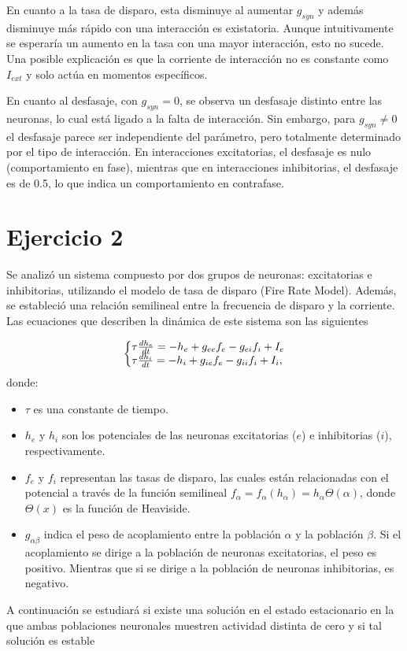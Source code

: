 \documentclass[aps,prb,twocolumn,superscriptaddress,floatfix,longbibliography]{revtex4-2}
\newcounter{para}
\begin{document}
En cuanto a la tasa de disparo, esta disminuye al aumentar \(g_{syn}\) y además disminuye más rápido con una interacción es existatoria. Aunque intuitivamente se esperaría un aumento en la tasa con una mayor interacción, esto no sucede. Una posible explicación es que la corriente de interacción no es constante como $I_{ext}$ y solo actúa en momentos específicos.

En cuanto al desfasaje, con $g_{syn} = 0$, se observa un desfasaje distinto entre las neuronas, lo cual está ligado a la falta de interacción. Sin embargo, para $g_{syn} \neq 0$ el desfasaje parece ser independiente del parámetro, pero totalmente determinado por el tipo de interacción. En interacciones excitatorias, el desfasaje es nulo (comportamiento en fase), mientras que en interacciones inhibitorias, el desfasaje es de 0.5, lo que indica un comportamiento en contrafase.

\section{Ejercicio 2}


Se analizó un sistema compuesto por dos grupos de neuronas: excitatorias e inhibitorias, utilizando el modelo de tasa de disparo (Fire Rate Model). Además, se estableció una relación semilineal entre la frecuencia de disparo y la corriente. Las ecuaciones que describen la dinámica de este sistema son las siguientes

\[
\left\{\begin{array}{@{}l@{}}
    \tau \frac{dh_e}{dt} = -h_e + g_{ee} f_e - g_{ei} f_i + I_e \\
    \tau \frac{dh_i}{dt} = -h_i + g_{ie} f_e - g_{ii} f_i + I_i,
    \end{array}\right.
\]
donde:
\begin{itemize}
    \item $\tau$ es una constante de tiempo.
    \item $h_e$ y $h_i$ son los potenciales de las neuronas excitatorias ($e$) e inhibitorias ($i$), respectivamente.
    \item $f_e$ y $f_i$ representan las tasas de disparo, las cuales están relacionadas con el potencial a través de la función semilineal $f_\alpha = f_\alpha(h_\alpha) = h_\alpha\Theta(\alpha)$, donde $\Theta(x)$ es la función de Heaviside.
    \item $g_{\alpha \beta}$ indica el peso de acoplamiento entre la población $\alpha$ y la población $\beta$. Si el acoplamiento se dirige a la población de neuronas excitatorias, el peso es positivo. Mientras que si se dirige a la población de neuronas inhibitorias, es negativo.
\end{itemize}
A continuación se estudiará si existe una solución en el estado estacionario en la que ambas poblaciones neuronales muestren actividad distinta de cero y si tal solución es estable
\end{document}
